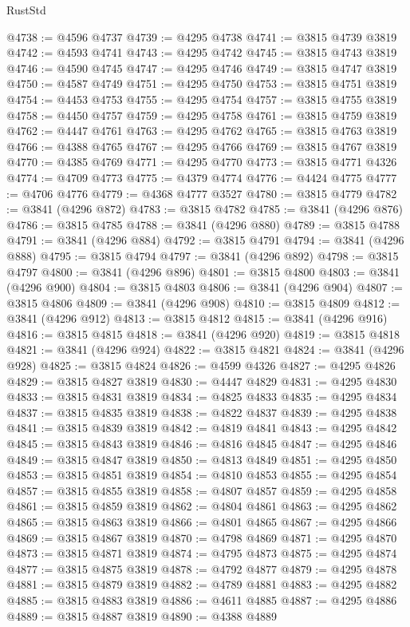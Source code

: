 \begin{lexlean}{RustStd}
\begin{coremodule}
@4738 := @4596 @4737
@4739 := @4295 @4738
@4741 := @3815 @4739 @3819
@4742 := @4593 @4741
@4743 := @4295 @4742
@4745 := @3815 @4743 @3819
@4746 := @4590 @4745
@4747 := @4295 @4746
@4749 := @3815 @4747 @3819
@4750 := @4587 @4749
@4751 := @4295 @4750
@4753 := @3815 @4751 @3819
@4754 := @4453 @4753
@4755 := @4295 @4754
@4757 := @3815 @4755 @3819
@4758 := @4450 @4757
@4759 := @4295 @4758
@4761 := @3815 @4759 @3819
@4762 := @4447 @4761
@4763 := @4295 @4762
@4765 := @3815 @4763 @3819
@4766 := @4388 @4765
@4767 := @4295 @4766
@4769 := @3815 @4767 @3819
@4770 := @4385 @4769
@4771 := @4295 @4770
@4773 := @3815 @4771 @4326
@4774 := @4709 @4773
@4775 := @4379 @4774
@4776 := @4424 @4775
@4777 := @4706 @4776
@4779 := @4368 @4777 @3527
@4780 := @3815 @4779
@4782 := @3841 (@4296 @872)
@4783 := @3815 @4782
@4785 := @3841 (@4296 @876)
@4786 := @3815 @4785
@4788 := @3841 (@4296 @880)
@4789 := @3815 @4788
@4791 := @3841 (@4296 @884)
@4792 := @3815 @4791
@4794 := @3841 (@4296 @888)
@4795 := @3815 @4794
@4797 := @3841 (@4296 @892)
@4798 := @3815 @4797
@4800 := @3841 (@4296 @896)
@4801 := @3815 @4800
@4803 := @3841 (@4296 @900)
@4804 := @3815 @4803
@4806 := @3841 (@4296 @904)
@4807 := @3815 @4806
@4809 := @3841 (@4296 @908)
@4810 := @3815 @4809
@4812 := @3841 (@4296 @912)
@4813 := @3815 @4812
@4815 := @3841 (@4296 @916)
@4816 := @3815 @4815
@4818 := @3841 (@4296 @920)
@4819 := @3815 @4818
@4821 := @3841 (@4296 @924)
@4822 := @3815 @4821
@4824 := @3841 (@4296 @928)
@4825 := @3815 @4824
@4826 := @4599 @4326
@4827 := @4295 @4826
@4829 := @3815 @4827 @3819
@4830 := @4447 @4829
@4831 := @4295 @4830
@4833 := @3815 @4831 @3819
@4834 := @4825 @4833
@4835 := @4295 @4834
@4837 := @3815 @4835 @3819
@4838 := @4822 @4837
@4839 := @4295 @4838
@4841 := @3815 @4839 @3819
@4842 := @4819 @4841
@4843 := @4295 @4842
@4845 := @3815 @4843 @3819
@4846 := @4816 @4845
@4847 := @4295 @4846
@4849 := @3815 @4847 @3819
@4850 := @4813 @4849
@4851 := @4295 @4850
@4853 := @3815 @4851 @3819
@4854 := @4810 @4853
@4855 := @4295 @4854
@4857 := @3815 @4855 @3819
@4858 := @4807 @4857
@4859 := @4295 @4858
@4861 := @3815 @4859 @3819
@4862 := @4804 @4861
@4863 := @4295 @4862
@4865 := @3815 @4863 @3819
@4866 := @4801 @4865
@4867 := @4295 @4866
@4869 := @3815 @4867 @3819
@4870 := @4798 @4869
@4871 := @4295 @4870
@4873 := @3815 @4871 @3819
@4874 := @4795 @4873
@4875 := @4295 @4874
@4877 := @3815 @4875 @3819
@4878 := @4792 @4877
@4879 := @4295 @4878
@4881 := @3815 @4879 @3819
@4882 := @4789 @4881
@4883 := @4295 @4882
@4885 := @3815 @4883 @3819
@4886 := @4611 @4885
@4887 := @4295 @4886
@4889 := @3815 @4887 @3819
@4890 := @4388 @4889

\end{coremodule}
\end{lexlean}
